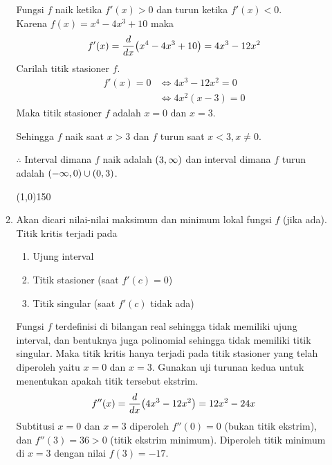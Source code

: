 \begin{enumerate}[leftmargin=*, label={\arabic*}.]
\begin{enumerate}[label={\alph*}.]
    Fungsi $f$ naik ketika $f'(x) > 0$ dan turun ketika $f'(x) < 0$.\\
    Karena $f(x)=x^{4}-4x^{3}+10$ maka
    \[
    f'(x) = \drv{x}{x^{4}-4x^{3}+10} = 4x^{3}-12x^{2}
    \]
    Carilah titik stasioner $f$.
    \begin{align*}
        f'(x)=0 &\iff 4x^{3}-12x^{2}=0\\
        &\iff 4x^{2}(x-3) = 0
    \end{align*}
    Maka titik stasioner $f$ adalah $x=0$ dan $x=3$.
    \begin{center}
    \end{center}
    Sehingga $f$ naik saat $x > 3$ dan $f$ turun saat $x < 3, x\neq 0$.

    $\therefore$ Interval dimana $f$ naik adalah $(3, \infty)$ dan interval dimana 
    $f$ turun adalah $(-\infty,0)\cup(0,3)$.
\begin{center}
    \line(1,0){150}
\end{center}
    \item Akan dicari nilai-nilai maksimum dan minimum lokal fungsi $f$ (jika ada).\\
    Titik kritis terjadi pada
    \begin{enumerate}[label={\arabic*})]
        \item Ujung interval
        \item Titik stasioner (saat $f'(c)=0$)
        \item Titik singular (saat $f'(c)$ tidak ada)
    \end{enumerate}
    Fungsi $f$ terdefinisi di bilangan real sehingga tidak memiliki ujung interval, dan bentuknya 
    juga polinomial sehingga tidak memiliki titik singular. Maka titik kritis hanya terjadi pada 
    titik stasioner yang telah diperoleh yaitu $x=0$ dan $x=3$. Gunakan uji turunan kedua 
    untuk menentukan apakah titik tersebut ekstrim.
    \[
        f''(x) = \drv{x}{4x^{3}-12x^{2}} = 12x^{2}-24x
    \]
    Subtitusi $x = 0$ dan $x = 3$ diperoleh $f''(0) = 0$ (bukan titik ekstrim), dan 
    $f''(3) = 36 > 0$ (titik ekstrim minimum). Diperoleh titik minimum di $x=3$ dengan nilai 
    $f(3) = -17$.


\end{enumerate}
\end{enumerate}
